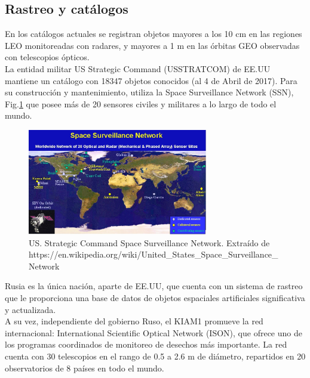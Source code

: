 
\subsection{Rastreo y cat\'alogos}\label{subsec:redes}

En los catálogos actuales se registran objetos mayores a los 10 cm en las regiones LEO monitoreadas con radares, y mayores a 1 m en las órbitas GEO observadas con telescopios ópticos.\\
 
La entidad militar US Strategic Command (USSTRATCOM) de EE.UU mantiene un catálogo con 18347 objetos conocidos (al 4 de Abril de 2017). Para su construcci\'on y mantenimiento, utiliza la Space Surveillance Network (SSN), Fig.\ref{fig:usnet}  que posee m\'as de 20 sensores civiles y militares a lo largo de todo el mundo.\\

\begin{figure}[!h]
  \centering
  \includegraphics[width=0.7\textwidth]{imagenes/SpSNet}
  \caption[USSTRATCOM - SSN]{US. Strategic Command Space Surveillance Network. Extra\'ido de https://en.wikipedia.org/wiki/United\_States\_Space\_Surveillance\_Network}
  \label{fig:usnet}
\end{figure}

Rusia es la única nación, aparte de EE.UU, que cuenta con un sistema de rastreo que le proporciona una base de datos de objetos espaciales artificiales significativa y actualizada.\\
A su vez, independiente del gobierno Ruso, el KIAM1 promueve la red internacional: International Scientific Optical Network (ISON), que ofrece uno de los programas coordinados de monitoreo de desechos más importante.
La red cuenta con 30 telescopios en el rango de 0.5 a 2.6 m de diámetro, repartidos en 20 observatorios de 8 países en todo el mundo.\\

